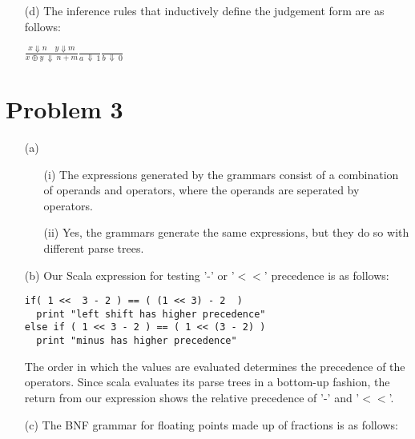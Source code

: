 \documentclass[12pt]{article}
\newcommand\tab[1][1cm]{\hspace*{#1}} %
\begin{document}
{\begin{enumerate}
\item[(d)] The inference rules that inductively define the judgement form are as follows:\\
\begin{center}
${\displaystyle \frac{ x \Downarrow n  \quad  y \Downarrow m}{x \oplus y \: \Downarrow \: n+m}}$\tab ${\displaystyle \frac{}{a \: \Downarrow \: 1}}$\tab ${\displaystyle\frac{}{b \: \Downarrow \: 0}}$
\end{center}
\end{enumerate}

{\selectfont\vspace{-8mm}
\section*{{\selectfont Problem 3}}\vspace{-10mm}
\begin{enumerate}

\item[(a)]
\begin{enumerate}
\item[(i)] The expressions generated by the grammars consist of a combination of operands and operators, where the operands are seperated by operators.

\item[(ii)] Yes, the grammars generate the same expressions, but they do so with different parse trees.

\end{enumerate}

\item[(b)] Our Scala expression for testing '-' or '$<<$' precedence  is as follows:
\begin{verbatim}
if( 1 <<  3 - 2 ) == ( (1 << 3) - 2  )
  print "left shift has higher precedence"
else if ( 1 << 3 - 2 ) == ( 1 << (3 - 2) )
  print "minus has higher precedence"
\end{verbatim}

\tab The order in which the values are evaluated determines the precedence of the operators. Since scala evaluates its parse trees in a bottom-up fashion, the return from our expression shows the relative precedence of '-' and '$<<$'.

\item[(c)] The BNF grammar for floating points made up of fractions is as follows:


\end{enumerate}}}
\end{document}
